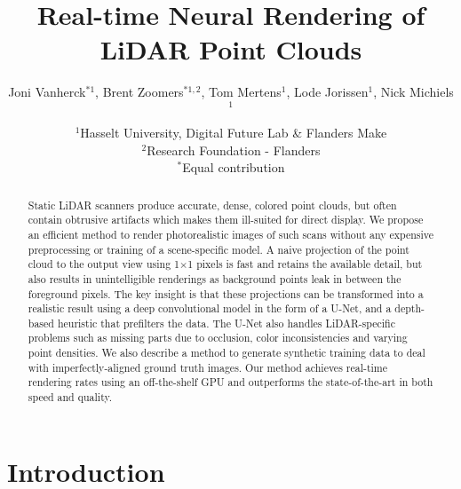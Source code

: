 \documentclass[twocolumn]{article}
\title{\bf Real-time Neural Rendering of LiDAR Point Clouds}
\author{
    Joni Vanherck$^{*1}$, 
    Brent Zoomers$^{*1,2}$, 
    Tom Mertens$^{1}$,
    Lode Jorissen$^{1}$, 
    Nick Michiels$^{1}$
}
\date{
    {\small
        $^1$Hasselt University, Digital Future Lab \& Flanders Make \\
        $^2$Research Foundation - Flanders \\
        $^*$Equal contribution
    }
}
\begin{document}
\maketitle

\begin{abstract}
Static LiDAR scanners produce accurate, dense, colored point clouds, but often contain obtrusive artifacts which makes them ill-suited for direct display. We propose an efficient method to render photorealistic images of such scans without any expensive preprocessing or training of a scene-specific model. A naive projection of the point cloud to the output view using 1$\times$1 pixels is fast and retains the available detail, but also results in unintelligible renderings as background points leak in between the foreground pixels. The key insight is that these projections can be transformed into a realistic result using a deep convolutional model in the form of a U-Net, and a depth-based heuristic that prefilters the data. The U-Net also handles LiDAR-specific problems such as missing parts due to occlusion, color inconsistencies and varying point densities. We also describe a method to generate synthetic training data to deal with imperfectly-aligned ground truth images. Our method achieves real-time rendering rates using an off-the-shelf GPU and outperforms the state-of-the-art in both speed and quality.
 
\end{abstract}  
\section{Introduction}
\end{document}

